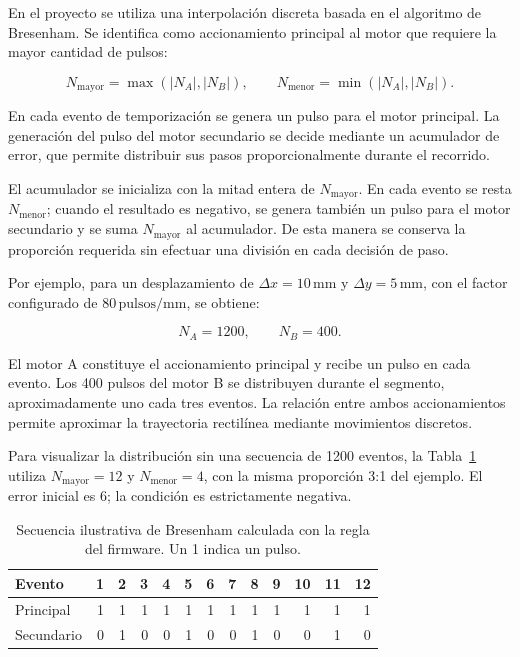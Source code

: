 \documentclass[blue,fullpaper]{ludusofficial}  %
\begin{document}
En el proyecto se utiliza una interpolación discreta
basada en el algoritmo de Bresenham. Se identifica
como accionamiento principal al motor que requiere
la mayor cantidad de pulsos:

\begin{equation}
    N_{\mathrm{mayor}} = \max(|N_A|,|N_B|),
    \qquad
    N_{\mathrm{menor}} = \min(|N_A|,|N_B|).
\end{equation}

En cada evento de temporización se genera un pulso
para el motor principal. La generación del pulso
del motor secundario se decide mediante un acumulador
de error, que permite distribuir sus pasos
proporcionalmente durante el recorrido.

El acumulador se inicializa con la mitad entera
de $N_{\mathrm{mayor}}$. En cada evento se resta
$N_{\mathrm{menor}}$; cuando el resultado es negativo,
se genera también un pulso para el motor secundario
y se suma $N_{\mathrm{mayor}}$ al acumulador.
De esta manera se conserva la proporción requerida
sin efectuar una división en cada decisión de paso.

Por ejemplo, para un desplazamiento de
$\Delta x = 10\,\mathrm{mm}$ y
$\Delta y = 5\,\mathrm{mm}$, con el factor
configurado de $80\,\mathrm{pulsos/mm}$, se obtiene:

\begin{equation}
    N_A = 1200,
    \qquad
    N_B = 400.
\end{equation}

El motor A constituye el accionamiento principal
y recibe un pulso en cada evento. Los 400 pulsos
del motor B se distribuyen durante el segmento,
aproximadamente uno cada tres eventos.
La relación entre ambos accionamientos permite
aproximar la trayectoria rectilínea mediante
movimientos discretos.

Para visualizar la distribución sin una secuencia de 1200 eventos, la Tabla~\ref{tab:bresenham-ejemplo} utiliza $N_{\mathrm{mayor}}=12$ y $N_{\mathrm{menor}}=4$, con la misma proporción 3:1 del ejemplo. El error inicial es 6; la condición es estrictamente negativa.

\begin{table}[htbp]
\centering\small
\caption{Secuencia ilustrativa de Bresenham calculada con la regla del firmware. Un 1 indica un pulso.}
\label{tab:bresenham-ejemplo}
\begin{tabular}{lrrrrrrrrrrrr}
\hline Evento &1&2&3&4&5&6&7&8&9&10&11&12\\
\hline Principal &1&1&1&1&1&1&1&1&1&1&1&1\\
Secundario &0&1&0&0&1&0&0&1&0&0&1&0\\
\hline
\end{tabular}
\end{table}
\end{document}
